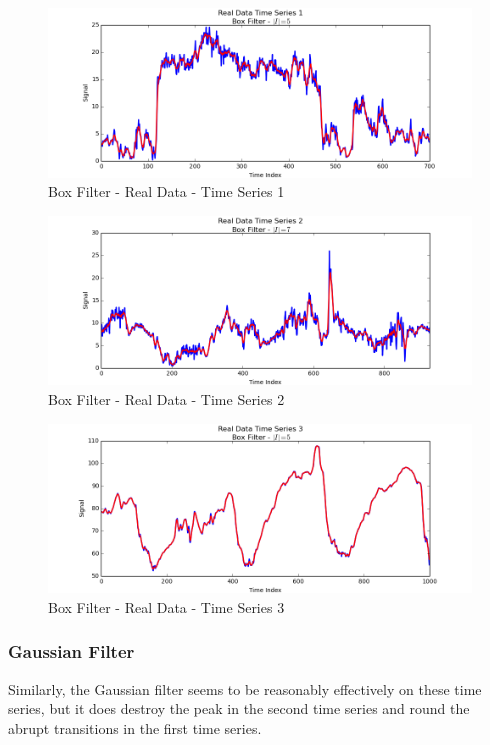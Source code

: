 \documentclass[11pt]{article}
\theoremstyle{definition}
\begin{document}
\begin{figure}
\centering
\includegraphics[width = 0.75 \textwidth]{BoxRealSignal1.png}
\caption{Box Filter - Real Data - Time Series 1}
\label{boxrealsignal1}
\end{figure}

\begin{figure}
\centering
\includegraphics[width = 0.75 \textwidth]{BoxRealSignal2.png}
\caption{Box Filter - Real Data - Time Series 2}
\label{boxrealsignal2}
\end{figure}

\begin{figure}
\centering
\includegraphics[width = 0.75 \textwidth]{BoxRealSignal3.png}
\caption{Box Filter - Real Data - Time Series 3}
\label{boxrealsignal3}
\end{figure}

\newpage

\subsubsection{Gaussian Filter}

Similarly, the Gaussian filter seems to be reasonably effectively on these time series, but it does destroy the peak in the second time series and round the abrupt transitions in the first time series.
\end{document}
